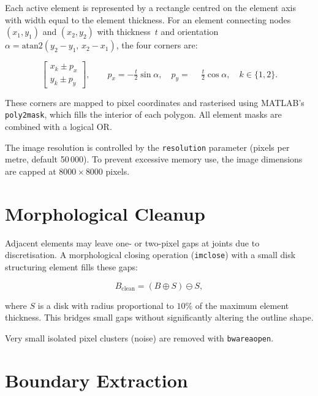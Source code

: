 Each active element is represented by a rectangle centred on the element
axis with width equal to the element thickness.  For an element connecting
nodes $(x_1, y_1)$ and $(x_2, y_2)$ with thickness~$t$ and orientation
$\alpha = \text{atan2}(y_2 - y_1,\, x_2 - x_1)$, the four corners are:

\begin{equation}
    \begin{bmatrix} x_k \pm p_x \\ y_k \pm p_y \end{bmatrix}, \qquad
    p_x = -\tfrac{t}{2}\sin\alpha, \quad
    p_y = \phantom{-}\tfrac{t}{2}\cos\alpha, \quad
    k \in \{1, 2\}.
\end{equation}

These corners are mapped to pixel coordinates and rasterised using MATLAB's
\texttt{poly2mask}, which fills the interior of each polygon.  All element
masks are combined with a logical OR.

The image resolution is controlled by the \texttt{resolution} parameter
(pixels per metre, default 50\,000).  To prevent excessive memory use, the
image dimensions are capped at $8000\times8000$ pixels.

\section{Morphological Cleanup}
\label{sec:export:morph}

Adjacent elements may leave one- or two-pixel gaps at joints due to
discretisation.  A morphological closing operation (\texttt{imclose}) with a
small disk structuring element fills these gaps:

\begin{equation}
    B_{\text{clean}} = (B \oplus S) \ominus S,
\end{equation}

where $S$ is a disk with radius proportional to $10\%$ of the maximum
element thickness.  This bridges small gaps without significantly altering
the outline shape.

Very small isolated pixel clusters (noise) are removed with
\texttt{bwareaopen}.

\section{Boundary Extraction}
\label{sec:export:boundary}

